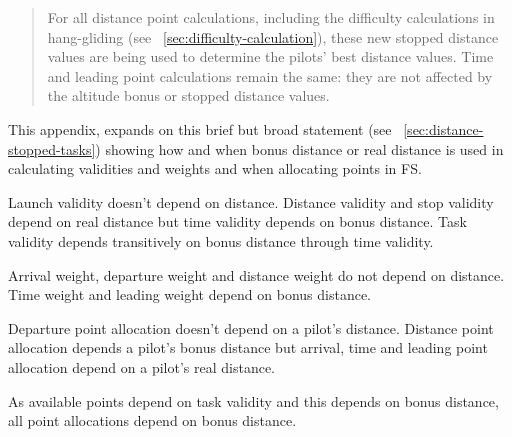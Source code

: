 \documentclass[gap.tex]{subfiles}
\begin{document}
\label{sec:bonus-distance-use}

\begin{quote}
    For all distance point calculations, including the difficulty calculations
    in hang-gliding (see ~\ref{sec:difficulty-calculation}), these new stopped
    distance values are being used to determine the pilots’ best distance
    values.  Time and leading point calculations remain the same: they are not
    affected by the altitude bonus or stopped distance values. 
\end{quote}

This appendix, expands on this brief but broad statement (see
~\ref{sec:distance-stopped-tasks}) showing how and when bonus distance or real
distance is used in calculating validities and weights and when allocating
points in FS.

Launch validity doesn't depend on distance. Distance validity and stop validity
depend on real distance but time validity depends on bonus distance. Task
validity depends transitively on bonus distance through time validity.

Arrival weight, departure weight and distance weight do not depend on distance.
Time weight and leading weight depend on bonus distance.

Departure point allocation doesn't depend on a pilot's distance. Distance point
allocation depends a pilot's bonus distance but arrival, time and leading point
allocation depend on a pilot's real distance.

As available points depend on task validity and this depends on bonus distance, all point allocations depend on bonus distance.
\end{document}
